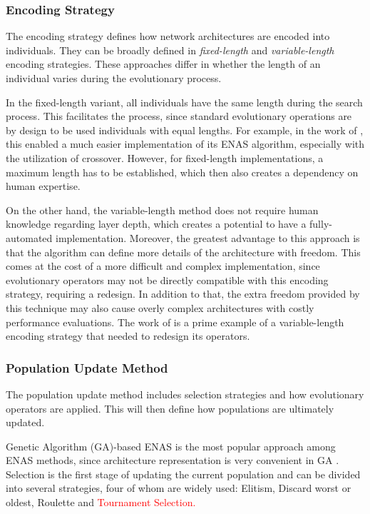 \documentclass[10pt,        %
               a4paper,     %
               journal,     %
               ]{IEEEtran}
\begin{document}
\subsubsection{Encoding Strategy}
The encoding strategy defines how network architectures are encoded into individuals. They can be broadly defined in
\textit{fixed-length} and \textit{variable-length} encoding strategies. These approaches differ in whether the length
of an individual varies during the evolutionary process.

In the fixed-length variant, all individuals have the same length during the search process. This facilitates
the process, since standard evolutionary operations are by design to be used individuals with equal lengths. For example,
in the work of \cite{xie2017genetic}, this enabled a much easier implementation of its ENAS
algorithm, especially with the utilization of crossover. However, for fixed-length implementations, a maximum
length has to be established, which then also creates a dependency on human expertise.

On the other hand, the variable-length method does not require human knowledge regarding layer depth, which creates
a potential to have a fully-automated implementation. Moreover, the greatest advantage to this approach is that the algorithm
can define more details of the architecture with freedom. This comes at the cost of a more difficult and complex implementation,
since evolutionary operators may not be directly compatible with this encoding strategy, requiring a redesign. In addition to that,
the extra freedom provided by this technique may also cause overly complex architectures
with costly performance evaluations. The work of \cite{sun2019evolving} is a prime example of a variable-length encoding strategy
that needed to redesign its operators.

\subsubsection{Population Update Method}
\label{pop}
The population update method includes selection strategies and how evolutionary operators are applied. This will then
define how populations are ultimately updated.

Genetic Algorithm (GA)-based ENAS is the most popular approach among ENAS methods, since architecture representation is
very convenient in GA \cite{liu2021survey}. Selection is the first stage of updating the current population and can
be divided into several strategies, four of whom are widely used: Elitism, Discard worst or oldest, Roulette and
\textcolor{red}{Tournament Selection. }
\end{document}
